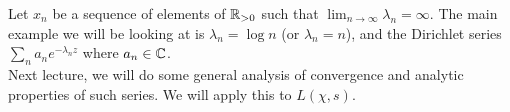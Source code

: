 \noindent Let $x_n$ be a sequence of elements of $\mathbb R_{> 0}$ such that $\lim_{n \to \infty} \lambda_n = \infty$. The main example we will be looking at is $\lambda_n = \log n$ (or $\lambda_n = n$), and the Dirichlet series $\sum_n a_n e^{-\lambda_n z}$ where $a_n \in \mathbb C$.
\\[8pt]
Next lecture, we will do some general analysis of convergence and analytic properties of such series. We will apply this to $L(\chi, s)$.